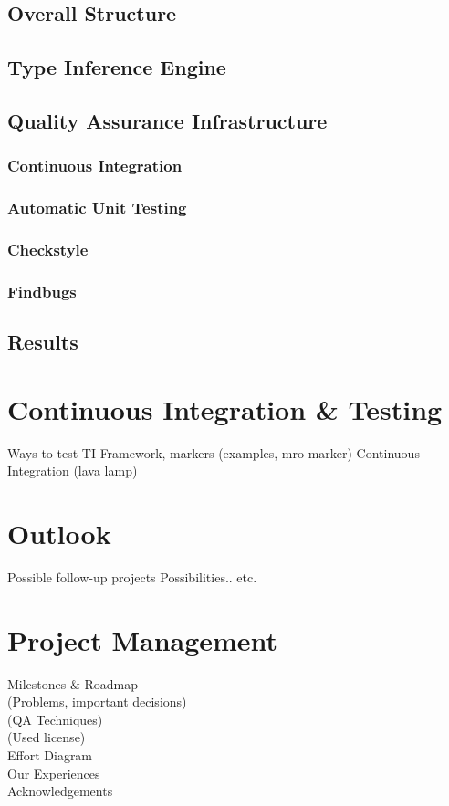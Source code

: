 \documentclass[12pt,halfparskip]{scrreprt}
\begin{document}
\section{Overall Structure}
\section{Type Inference Engine}
\section{Quality Assurance Infrastructure}
\subsection{Continuous Integration}
\subsection{Automatic Unit Testing}
\subsection{Checkstyle}
\subsection{Findbugs}
\section{Results}

\chapter{Continuous Integration \& Testing}
 Ways to test TI
 Framework, markers
  (examples, mro marker)
 Continuous Integration
  (lava lamp)

\chapter{Outlook}
 Possible follow-up projects
 Possibilities.. etc.

\chapter{Project Management}
 Milestones \& Roadmap \\
 (Problems, important decisions) \\
 (QA Techniques) \\
 (Used license) \\
 Effort Diagram \\
 Our Experiences \\
 Acknowledgements 
\end{document}
